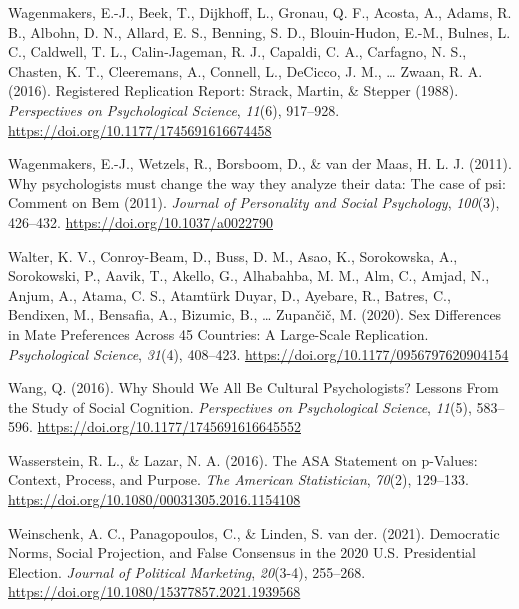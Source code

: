 \documentclass[
  letterpaper,
]{book}
\newlength{\cslhangindent}
\newenvironment{CSLReferences}[2] %
 {\begin{list}{}{%
  \setlength{\itemindent}{0pt}
  \setlength{\leftmargin}{0pt}
  \setlength{\parsep}{0pt}
  \ifodd #1
   \setlength{\leftmargin}{\cslhangindent}
   \setlength{\itemindent}{-1\cslhangindent}
  \fi
  \setlength{\itemsep}{#2\baselineskip}}}
 {\end{list}}
\begin{document}
\begin{CSLReferences}{1}{0}
Wagenmakers, E.-J., Beek, T., Dijkhoff, L., Gronau, Q. F., Acosta, A.,
Adams, R. B., Albohn, D. N., Allard, E. S., Benning, S. D.,
Blouin-Hudon, E.-M., Bulnes, L. C., Caldwell, T. L., Calin-Jageman, R.
J., Capaldi, C. A., Carfagno, N. S., Chasten, K. T., Cleeremans, A.,
Connell, L., DeCicco, J. M., \ldots{} Zwaan, R. A. (2016). Registered
{Replication} {Report}: {Strack}, {Martin}, \& {Stepper} (1988).
\emph{Perspectives on Psychological Science}, \emph{11}(6), 917--928.
\url{https://doi.org/10.1177/1745691616674458}

Wagenmakers, E.-J., Wetzels, R., Borsboom, D., \& van der Maas, H. L. J.
(2011). Why psychologists must change the way they analyze their data:
{The case of psi}:{ Comment on Bem (2011)}. \emph{Journal of Personality
and Social Psychology}, \emph{100}(3), 426--432.
\url{https://doi.org/10.1037/a0022790}

Walter, K. V., Conroy-Beam, D., Buss, D. M., Asao, K., Sorokowska, A.,
Sorokowski, P., Aavik, T., Akello, G., Alhabahba, M. M., Alm, C., Amjad,
N., Anjum, A., Atama, C. S., Atamtürk Duyar, D., Ayebare, R., Batres,
C., Bendixen, M., Bensafia, A., Bizumic, B., \ldots{} Zupančič, M.
(2020). Sex {Differences} in {Mate} {Preferences} {Across} 45
{Countries}: {A} {Large}-{Scale} {Replication}. \emph{Psychological
Science}, \emph{31}(4), 408--423.
\url{https://doi.org/10.1177/0956797620904154}

Wang, Q. (2016). Why {Should} {We} {All} {Be} {Cultural}
{Psychologists}? {Lessons} {From} the {Study} of {Social} {Cognition}.
\emph{Perspectives on Psychological Science}, \emph{11}(5), 583--596.
\url{https://doi.org/10.1177/1745691616645552}

Wasserstein, R. L., \& Lazar, N. A. (2016). The {ASA} {Statement} on
p-{Values}: {Context}, {Process}, and {Purpose}. \emph{The American
Statistician}, \emph{70}(2), 129--133.
\url{https://doi.org/10.1080/00031305.2016.1154108}

Weinschenk, A. C., Panagopoulos, C., \& Linden, S. van der. (2021).
Democratic {Norms}, {Social} {Projection}, and {False} {Consensus} in
the 2020 {U}.{S}. {Presidential} {Election}. \emph{Journal of Political
Marketing}, \emph{20}(3-4), 255--268.
\url{https://doi.org/10.1080/15377857.2021.1939568}


\end{CSLReferences}
\end{document}
